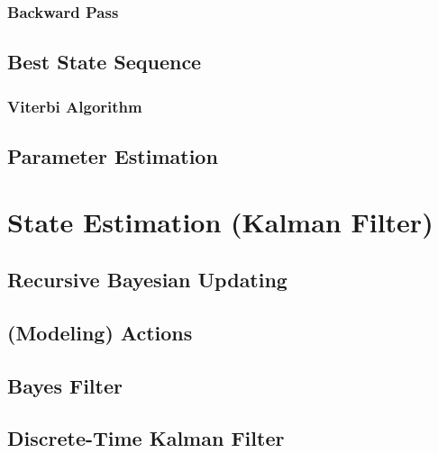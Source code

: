             \subsubsection{Backward Pass} %

        \subsection{Best State Sequence} %

            \subsubsection{Viterbi Algorithm} %

        \subsection{Parameter Estimation} %

    \section{State Estimation (Kalman Filter)} %

        \subsection{Recursive Bayesian Updating} %

        \subsection{(Modeling) Actions} %

        \subsection{Bayes Filter} %

        \subsection{Discrete-Time Kalman Filter} %

